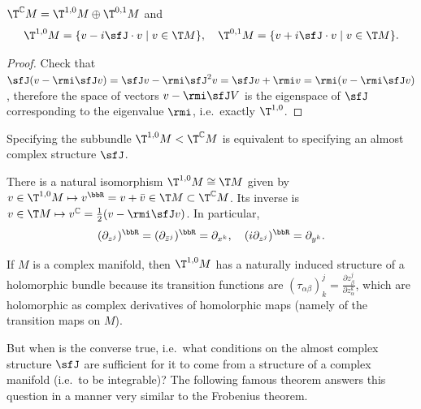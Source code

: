 \begin{prop}
    $\T^\mathbb{C}M=\T^{1,0}M\oplus \T^{0,1}M$ and 
    \[\T^{1,0}M=\{v-i\sfJ\cdot v\mid v\in \T M \}, \quad \T^{0,1}M=\{v+i\sfJ\cdot v\mid v\in \T M \}.\]
\end{prop}
\begin{proof}
    Check that $\sfJ(v-\rmi\sfJ v)=\sfJ v-\rmi\sfJ^2v=\sfJ v+\rmi v=\rmi(v-\rmi\sfJ v)$, therefore the space of vectors $v-\rmi\sfJ V$ is the eigenspace of $\sfJ$ corresponding to the eigenvalue $\rmi$, i.e.\ exactly $\T^{1,0}$.
\end{proof}

Specifying the subbundle $\T^{1,0}M<\T^\mathbb{C}M$ is equivalent to specifying an almost complex structure $\sfJ$.

There is a natural isomorphism $\T^{1,0}M\cong \T M$ given by $v\in \T^{1,0}M\mapsto v^\bbR =v+\bar v\in \T M\subset \T^\mathbb{C} M$. Its inverse is $v\in \T M\mapsto v^\mathbb{C}=\frac12(v-\rmi\sfJ v)$. In particular,
\[(\partial_{z^j})^\bbR =(\partial_{\bar z^j})^\bbR =\partial_{x^k},\quad (i\partial_{z^j})^\bbR =\partial_{y^k}.\]

If $M$ is a complex manifold, then $\T^{1,0}M$ has a naturally induced structure of a holomorphic bundle because its transition functions are $(\tau_{\alpha\beta})^j_k=\frac{\partial z_\beta^j}{\partial z_\alpha^k}$, which are holomorphic as complex derivatives of homolorphic maps (namely of the transition maps on $M$).

But when is the converse true, i.e.\ what conditions on the almost complex structure $\sfJ$ are sufficient for it to come from a structure of a complex manifold (i.e.\ to be integrable)? The following famous theorem answers this question in a manner very similar to the Frobenius theorem.

